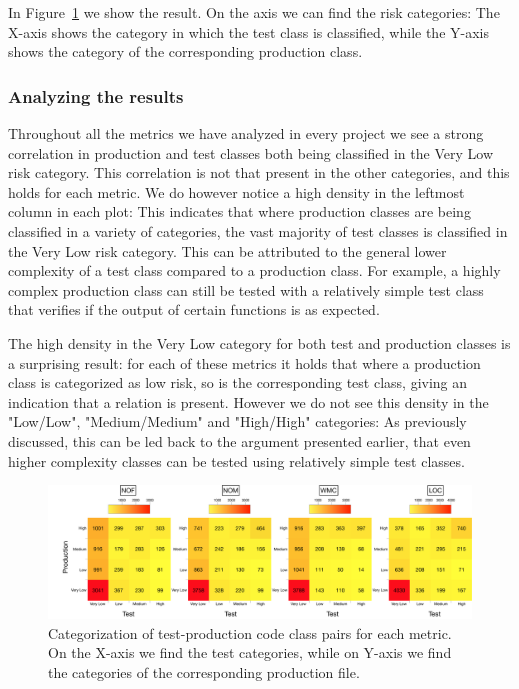 In Figure~\ref{fig:heat_map} we show the result. On the axis we can find the risk categories: The X-axis shows the category in which the test class is classified, while the Y-axis shows the category of the corresponding production class. 

\subsubsection{Analyzing the results}
Throughout all the metrics we have analyzed in every project we see a strong correlation in production and test classes both being classified in the Very Low risk category. This correlation is not that present in the other categories, and this holds for each metric. We do however notice a high density in the leftmost column in each plot: This indicates that where production classes are being classified in a variety of categories, the vast majority of test classes is classified in the Very Low risk category. This can be attributed to the general lower complexity of a test class compared to a production class. For example, a highly complex production class can still be tested with a relatively simple test class that verifies if the output of certain functions is as expected.

The high density in the Very Low category for both test and production classes is a surprising result: for each of these metrics it holds that where a production class is categorized as low risk, so is the corresponding test class, giving an indication that a relation is present. However we do not see this density in the "Low/Low", "Medium/Medium" and "High/High" categories: As previously discussed, this can be led back to the argument presented earlier, that even higher complexity classes can be tested using relatively simple test classes.

\begin{figure}
    \centering
    \includegraphics[width=\textwidth]{resources/heat_map.pdf}
    \caption{Categorization of test-production code class pairs for each metric. On the X-axis we find the test categories, while on Y-axis we find the categories of the corresponding production file.}
    \label{fig:heat_map}
\end{figure}
